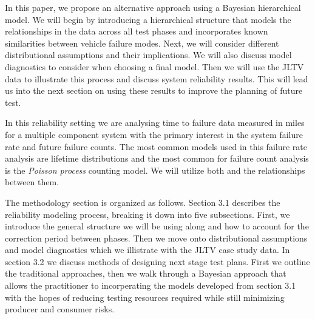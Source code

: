 \documentclass[12pt]{article}
\begin{document}
In this paper, we propose an alternative approach using a Bayesian hierarchical
model.  We will begin by introducing a hierarchical structure that models the
relationships in the data across all test phases and incorporates known
similarities between vehicle failure modes.  Next, we will consider different
distributional assumptions and their implications.  We will also
discuss model diagnostics to consider when choosing a final model. Then we will
use the JLTV data to illustrate this process and discuss system reliability
results. This will lead us into the next section on using these results to
improve the planning of future test.

In this reliability setting we are analysing time to failure data measured in
miles for a multiple component system with the primary interest in the system
failure rate and future failure counts.  The most common models used in this
failure rate analysis are lifetime distributions and the most common for failure
count analysis is the \emph{Poisson process} counting model.  We will utilize
both and the relationships between them.

The methodology section is organized as follows.  Section 3.1 describes the
reliability modeling process, breaking it down into five subsections.  First, we
introduce the general structure we will be using along and how to account for
the correction period between phases.  Then we move onto distributional
assumptions and model diagnostics which we illistrate with the JLTV case study
data.  In section 3.2 we discuss methods of designing next stage test plans.
First we outline the traditional approaches, then we walk through a Bayesian
approach that allows the practitioner to incorperating the models developed from
section 3.1 with the hopes of reducing testing resources required while still
minimizing producer and consumer risks.
\end{document}
